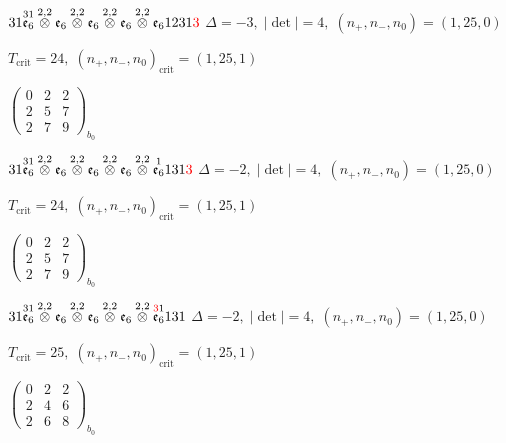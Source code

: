 \documentclass[10pt]{article}
\begin{document}
$31\overset{31}{\mathfrak{e}_6}\overset{2,2}{\otimes}\mathfrak{e}_6\overset{2,2}{\otimes}\mathfrak{e}_6\overset{2,2}{\otimes}\mathfrak{e}_6\overset{2,2}{\otimes}\mathfrak{e}_61231\textcolor{red}{3}$ \quad $\Delta=-3,\; |\det|=4,\; (n_+,n_-,n_0)=(1,25,0)$

\hspace{1em}$T_{\text{crit}}=24,\; (n_+,n_-,n_0)_{\text{crit}}=(1,25,1)$

\hspace{2em}$\left(\begin{smallmatrix}0 & 2 & 2 \\ 2 & 5 & 7 \\ 2 & 7 & 9\end{smallmatrix}\right)_{\!b_0}$

\smallskip

$31\overset{31}{\mathfrak{e}_6}\overset{2,2}{\otimes}\mathfrak{e}_6\overset{2,2}{\otimes}\mathfrak{e}_6\overset{2,2}{\otimes}\mathfrak{e}_6\overset{2,2}{\otimes}\overset{1}{\mathfrak{e}_6}131\textcolor{red}{3}$ \quad $\Delta=-2,\; |\det|=4,\; (n_+,n_-,n_0)=(1,25,0)$

\hspace{1em}$T_{\text{crit}}=24,\; (n_+,n_-,n_0)_{\text{crit}}=(1,25,1)$

\hspace{2em}$\left(\begin{smallmatrix}0 & 2 & 2 \\ 2 & 5 & 7 \\ 2 & 7 & 9\end{smallmatrix}\right)_{\!b_0}$

$31\overset{31}{\mathfrak{e}_6}\overset{2,2}{\otimes}\mathfrak{e}_6\overset{2,2}{\otimes}\mathfrak{e}_6\overset{2,2}{\otimes}\mathfrak{e}_6\overset{2,2}{\otimes}\overset{\textcolor{red}{3}1}{\mathfrak{e}_6}131$ \quad $\Delta=-2,\; |\det|=4,\; (n_+,n_-,n_0)=(1,25,0)$

\hspace{1em}$T_{\text{crit}}=25,\; (n_+,n_-,n_0)_{\text{crit}}=(1,25,1)$

\hspace{2em}$\left(\begin{smallmatrix}0 & 2 & 2 \\ 2 & 4 & 6 \\ 2 & 6 & 8\end{smallmatrix}\right)_{\!b_0}$
\end{document}
